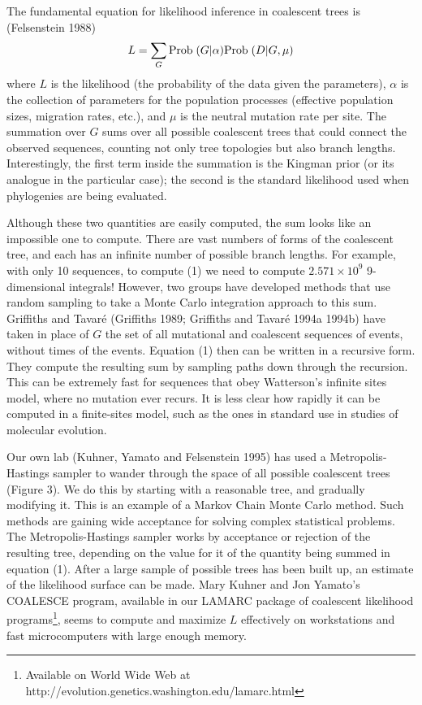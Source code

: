 \documentclass[12pt]{article}
\begin{document}
The fundamental equation for likelihood inference in coalescent trees is
(Felsenstein 1988)
\begin{equation}
L = \sum\limits_{G} {\rm Prob\;}(G|\alpha) {\rm Prob\;}(D|G, \mu)
\end{equation}
where $L$ is the likelihood (the probability of the data given the
parameters), $\alpha$ is the collection of parameters for the population
processes (effective population sizes, migration rates, etc.), and $\mu$ is
the neutral mutation rate per site.  The summation over $G$ sums over all
possible coalescent trees that could connect the observed sequences,
counting not only tree topologies but also branch lengths.
Interestingly, the first term inside the summation is the Kingman prior
(or its analogue in the particular case); the second is the standard
likelihood used when phylogenies are being evaluated.

Although these two quantities are easily computed, the sum looks like an
impossible one to compute.  There are vast numbers of forms of the
coalescent tree, and each has an infinite number of possible branch
lengths. For example, with only 10 sequences, to compute (1) we need to compute 
$2.571 \times 10^9$ 9-dimensional integrals!  However, two groups have
developed methods that use random sampling to take a Monte Carlo integration
approach to this sum.  Griffiths and Tavar\'e (Griffiths 1989; Griffiths and Tavar\'e 1994a 1994b)
have taken in place of $G$ the set of all mutational and coalescent sequences
of events, without times of the events.  Equation (1) then can be
written in a recursive form.  They compute the resulting sum by sampling
paths down through the recursion.  This can be extremely fast for sequences
that obey Watterson's infinite sites model, where no mutation ever recurs.
It is less clear how rapidly it can be computed in a finite-sites model,
such as the ones in standard use in studies of molecular evolution.

Our own lab (Kuhner, Yamato and Felsenstein 1995) has used a Metropolis-Hastings
sampler to wander through the space of all possible coalescent trees (Figure 3).  We
do this by starting with a reasonable tree, and gradually modifying it.
This is an example of a Markov Chain Monte Carlo method.  Such methods are
gaining wide acceptance for solving complex statistical problems.
The Metropolis-Hastings sampler works by acceptance or rejection of the
resulting tree,
depending on the value for it of the quantity being summed in equation (1).
After a large sample of possible trees has been built up, an estimate
of the likelihood surface can be made.
Mary Kuhner and Jon Yamato's COALESCE program, available in our LAMARC
package of coalescent likelihood programs\footnote{Available on World Wide Web at http://evolution.genetics.washington.edu/lamarc.html}, seems to compute and maximize
$L$ effectively on workstations and fast microcomputers with large enough
memory.
\end{document}
